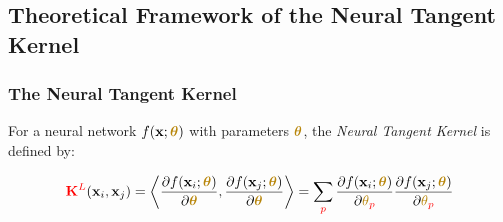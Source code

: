 \documentclass[a4paper]{article}
\theoremstyle{plain}
\theoremstyle{definition}
\theoremstyle{remark}
\begin{document}
\begin{center}
\begin{tcolorbox}[colback=gray!5,colframe=gray!50!black,title={\textbf{Framework Selection Decision Tree}},enhanced,drop shadow,width=0.9\textwidth]
\end{tcolorbox}
\end{center}




\subsection{Theoretical Framework of the Neural Tangent Kernel}

\subsubsection{The Neural Tangent Kernel}

For a neural network $f(\mathbf{x}; \boldsymbol{\textcolor{darkyellow}{\theta}})$ with parameters $\boldsymbol{\textcolor{darkyellow}{\theta}}$, the \textit{Neural Tangent Kernel} \cite{jacot2018neural} is defined by:
\begin{tcolorbox}[colback=yellow!10,colframe=blue!40!black,title=Definition : NTK]
\begin{equation}
\label{eq:ntk_definition}
\textcolor{red}{\mathbf{K}^{L}}(\mathbf{x}_i, \mathbf{x}_j) = \left\langle \frac{\partial f(\mathbf{x}_i; \boldsymbol{\textcolor{darkyellow}{\theta}})}{\partial \boldsymbol{\textcolor{darkyellow}{\theta}}}, \frac{\partial f(\mathbf{x}_j; \boldsymbol{\textcolor{darkyellow}{\theta}})}{\partial \boldsymbol{\textcolor{darkyellow}{\theta}}} \right\rangle = \sum_{\textcolor{red}{p}} \frac{\partial f(\mathbf{x}_i; \boldsymbol{\textcolor{darkyellow}{\theta}})}{\partial \textcolor{darkyellow}{\theta}_{\textcolor{red}{p}}} \frac{\partial f(\mathbf{x}_j; \boldsymbol{\textcolor{darkyellow}{\theta}})}{\partial \textcolor{darkyellow}{\theta}_{\textcolor{red}{p}}}
\end{equation}
\end{tcolorbox}
\end{document}
